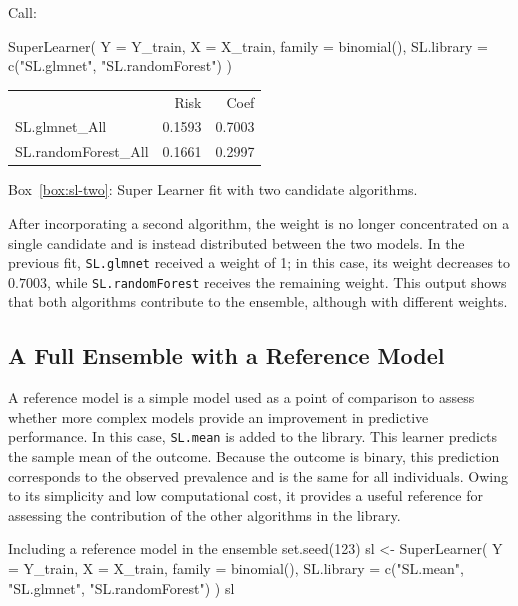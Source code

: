\documentclass[12pt]{article}
\newcommand{\routputcaption}[2]{%
    \par\smallskip
    \begin{center}
        Box~\ref{#1}: #2
    \end{center}
}
\begin{document}
\begin{routputboxref}[label={box:sl-two}]
	\ttfamily
	\raggedright
	
	Call:
	
	SuperLearner(
	Y = Y\_train, X = X\_train, family = binomial(),
	SL.library = c("SL.glmnet", "SL.randomForest")
	)
	
	\medskip
	
	\centering
	\begin{tabular}{lrr}
		& Risk & Coef \\
		SL.glmnet\_All       & 0.1593 & 0.7003 \\
		SL.randomForest\_All & 0.1661 & 0.2997 \\
	\end{tabular}
\end{routputboxref}

\routputcaption{box:sl-two}
{Super Learner fit with two candidate algorithms.}

After incorporating a second algorithm, the weight is no longer concentrated on a single candidate and is instead distributed between the two models. In the previous fit, \texttt{SL.glmnet} received a weight of 1; in this case, its weight decreases to $0.7003$, while \texttt{SL.randomForest} receives the remaining weight. This output shows that both algorithms contribute to the ensemble, although with different weights.

\subsection{A Full Ensemble with a Reference Model}
A reference model is a simple model used as a point of comparison to assess whether 
more complex models provide an improvement in predictive performance. In this case, 
\texttt{SL.mean} is added to the library. This learner predicts the sample mean of the 
outcome. Because the outcome is binary, this prediction corresponds to the observed 
prevalence and is the same for all individuals. Owing to its simplicity and low 
computational cost, it provides a useful reference for assessing the contribution of 
the other algorithms in the library.

\begin{rcode}[label={code:sl-reference}]{Including a reference model in the ensemble}
set.seed(123)
sl <- SuperLearner(
  Y = Y_train, X = X_train,
  family = binomial(),
  SL.library = c("SL.mean", "SL.glmnet", "SL.randomForest")
)
sl
\end{rcode}
\end{document}
